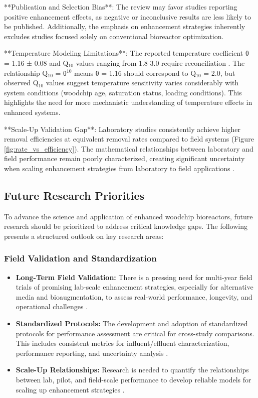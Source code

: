 \documentclass[12pt,a4paper]{article}
\begin{document}
**Publication and Selection Bias**: The review may favor studies reporting positive enhancement effects, as negative or inconclusive results are less likely to be published. Additionally, the emphasis on enhancement strategies inherently excludes studies focused solely on conventional bioreactor optimization.

**Temperature Modeling Limitations**: The reported temperature coefficient θ = 1.16 ± 0.08 and Q$_{10}$ values ranging from 1.8-3.0 require reconciliation \citep{RN242, RN228}. The relationship Q$_{10}$ = θ$^{10}$ means θ = 1.16 should correspond to Q$_{10}$ = 2.0, but observed Q$_{10}$ values suggest temperature sensitivity varies considerably with system conditions (woodchip age, saturation status, loading conditions). This highlights the need for more mechanistic understanding of temperature effects in enhanced systems.

**Scale-Up Validation Gap**: Laboratory studies consistently achieve higher removal efficiencies at equivalent removal rates compared to field systems (Figure \ref{fig:rate_vs_efficiency}). The mathematical relationships between laboratory and field performance remain poorly characterized, creating significant uncertainty when scaling enhancement strategies from laboratory to field applications \citep{RN312}.

\subsection{Future Research Priorities}

To advance the science and application of enhanced woodchip bioreactors, future research should be prioritized to address critical knowledge gaps. The following presents a structured outlook on key research areas:

\subsubsection{Field Validation and Standardization}
\begin{itemize}[leftmargin=*]
    \item \textbf{Long-Term Field Validation:} There is a pressing need for multi-year field trials of promising lab-scale enhancement strategies, especially for alternative media and bioaugmentation, to assess real-world performance, longevity, and operational challenges \citep{RN629}.
    \item \textbf{Standardized Protocols:} The development and adoption of standardized protocols for performance assessment are critical for cross-study comparisons. This includes consistent metrics for influent/effluent characterization, performance reporting, and uncertainty analysis \citep{RN310}.
    \item \textbf{Scale-Up Relationships:} Research is needed to quantify the relationships between lab, pilot, and field-scale performance to develop reliable models for scaling up enhancement strategies \citep{RN312}.
\end{itemize}
\end{document}
